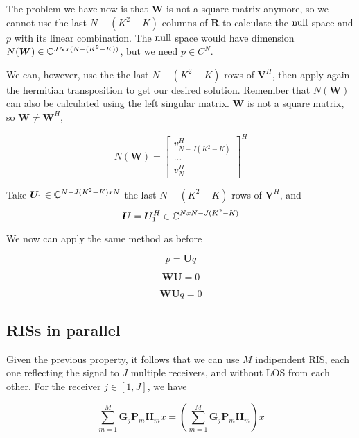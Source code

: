 The problem we have now is that $\bm{W}$ is not a square matrix anymore, so we cannot use the last $N - (K^2 - K)$ columns of $\bm{R}$ to calculate the $\operatorname{null}$ space and $p$ with its linear combination. The $\operatorname{null}$ space would have dimension $N(\bm{W}) \in \mathbb{C}^{JN x (N - (K^2 - K))}$, but we need $p \in C^N$.

We can, however, use the the last $N - (K^2 - K)$ rows of $\bm{V}^H$, then apply again the hermitian transposition to get our desired solution. Remember that $N(\bm{W})$ can also be calculated using the left singular matrix. $\bm{W}$ is not a square matrix, so $\bm{W} \ne \bm{W}^H$,

\begin{equation}
  N(\bm{W}) = \begin{bmatrix} v^H_{N - J(K^2 - K)} \\ ... \\ v^H_N \end{bmatrix} ^ H
\end{equation}

Take $\bm{U}_1 \in \mathbb{C} ^ {N - J(K^2 - K) x N}$ the last $N - (K^2 - K)$ rows of $\bm{V}^H$, and
\begin{equation}
  \bm{U} = \bm{U}_1^H \in \mathbb{C} ^ {N x N - J(K^2 - K)}
\end{equation}

We now can apply the same method as before

\begin{equation}p = \bm{U}q\end{equation}

\begin{equation}\bm{WU} = 0\end{equation}

\begin{equation}\bm{WU}q = 0\end{equation}

\subsection{RISs in parallel}

Given the previous property, it follows that we can use $M$ indipendent RIS, each one reflecting the signal to $J$ multiple receivers, and without LOS from each other. For the receiver $j \in [1, J]$, we have

\begin{equation}
  \sum_{m=1}^M \bm{G}_j \bm{P}_m \bm{H}_m x = (\sum_{m=1}^M \bm{G}_j \bm{P}_m \bm{H}_m) x
\end{equation}


